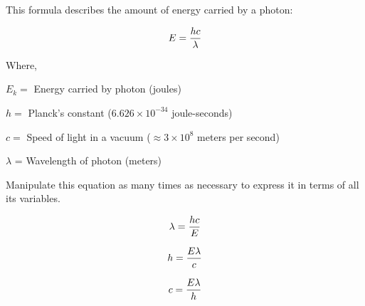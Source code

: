 

This formula describes the amount of energy carried by a photon:

$$E = {hc \over \lambda}$$

\noindent
Where,

$E_k =$ Energy carried by photon (joules)

$h =$ Planck's constant ($6.626 \times 10^{-34}$ joule-seconds)

$c =$ Speed of light in a vacuum ($\approx 3 \times 10^8$ meters per second)

$\lambda$ = Wavelength of photon (meters)

\vskip 10pt

Manipulate this equation as many times as necessary to express it in terms of all its variables.







$$\lambda = {hc \over E}$$

\vskip 20pt

$$h = {E \lambda \over c}$$

\vskip 20pt

$$c = {E \lambda \over h}$$











